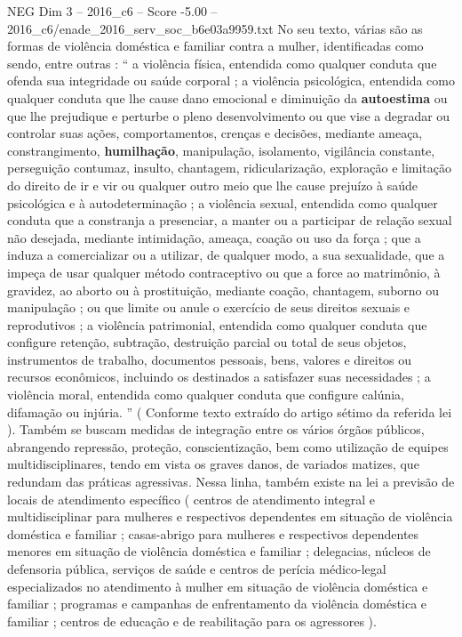 \begin{textsample}{NEG Dim 3 – 2016\_c6 – Score -5.00 – 2016\_c6/enade\_2016\_serv\_soc\_b6e03a9959.txt}
No seu texto, várias são as formas de violência doméstica e familiar contra a mulher, identificadas como sendo, entre outras : “ a violência física, entendida como qualquer conduta que ofenda sua integridade ou saúde corporal ; a violência psicológica, entendida como qualquer conduta que lhe cause dano emocional e diminuição da \textbf{autoestima} ou que lhe prejudique e perturbe o pleno desenvolvimento ou que vise a degradar ou controlar suas ações, comportamentos, crenças e decisões, mediante ameaça, constrangimento, \textbf{humilhação}, manipulação, isolamento, vigilância constante, perseguição contumaz, insulto, chantagem, ridicularização, exploração e limitação do direito de ir e vir ou qualquer outro meio que lhe cause prejuízo à saúde psicológica e à autodeterminação ; a violência sexual, entendida como qualquer conduta que a constranja a presenciar, a manter ou a participar de relação sexual não desejada, mediante intimidação, ameaça, coação ou uso da força ; que a induza a comercializar ou a utilizar, de qualquer modo, a sua sexualidade, que a impeça de usar qualquer método contraceptivo ou que a force ao matrimônio, à gravidez, ao aborto ou à prostituição, mediante coação, chantagem, suborno ou manipulação ; ou que limite ou anule o exercício de seus direitos sexuais e reprodutivos ; a violência patrimonial, entendida como qualquer conduta que configure retenção, subtração, destruição parcial ou total de seus objetos, instrumentos de trabalho, documentos pessoais, bens, valores e direitos ou recursos econômicos, incluindo os destinados a satisfazer suas necessidades ; a violência moral, entendida como qualquer conduta que configure calúnia, difamação ou injúria. ” ( Conforme texto extraído do artigo sétimo da referida lei ).
Também se buscam medidas de integração entre os vários órgãos públicos, abrangendo repressão, proteção, conscientização, bem como utilização de equipes multidisciplinares, tendo em vista os graves danos, de variados matizes, que redundam das práticas agressivas.
Nessa linha, também existe na lei a previsão de locais de atendimento específico ( centros de atendimento integral e multidisciplinar para mulheres e respectivos dependentes em situação de violência doméstica e familiar ; casas-abrigo para mulheres e respectivos dependentes menores em situação de violência doméstica e familiar ; delegacias, núcleos de defensoria pública, serviços de saúde e centros de perícia médico-legal especializados no atendimento à mulher em situação de violência doméstica e familiar ; programas e campanhas de enfrentamento da violência doméstica e familiar ; centros de educação e de reabilitação para os agressores ).

\end{textsample}
